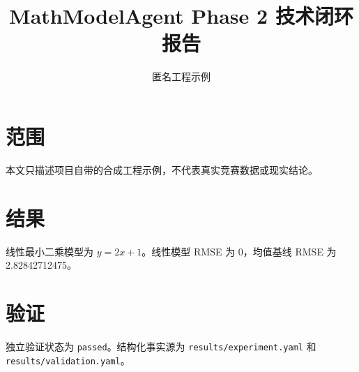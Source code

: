 \documentclass[UTF8]{ctexart}
\title{MathModelAgent Phase 2 技术闭环报告}
\author{匿名工程示例}
\date{}
\begin{document}
\maketitle
\section{范围}
本文只描述项目自带的合成工程示例，不代表真实竞赛数据或现实结论。
\section{结果}
线性最小二乘模型为 $y=2x+1$。线性模型 RMSE 为
0，均值基线 RMSE 为 2.82842712475。
\section{验证}
独立验证状态为 \texttt{passed}。结构化事实源为
\texttt{results/experiment.yaml} 和 \texttt{results/validation.yaml}。
\end{document}
